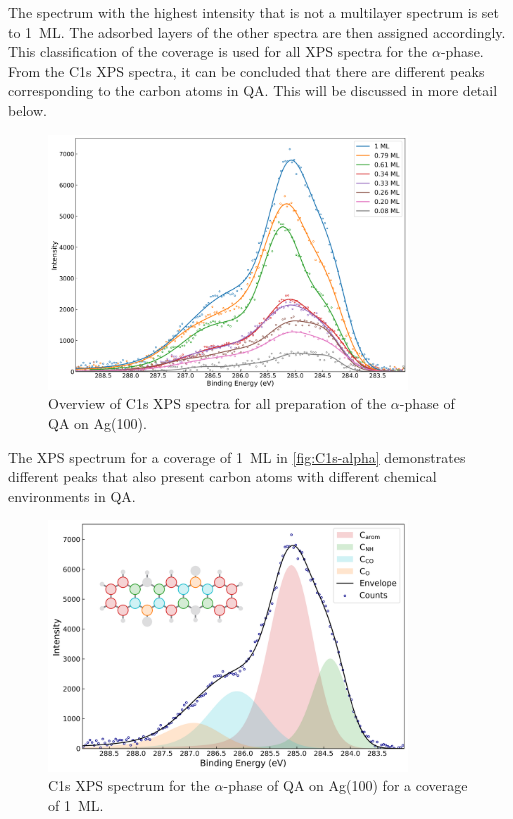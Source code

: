 The spectrum with the highest intensity that is not a multilayer spectrum is set to 1~\ac{ML}. The adsorbed layers of the other spectra are then assigned accordingly. This classification of the coverage is used for all \ac{XPS} spectra for the $\alpha$-phase.
From the C1s \ac{XPS} spectra, it can be concluded that there are different peaks corresponding to the carbon atoms in \ac{QA}. This will be discussed in more detail below.

\begin{figure}[H]
	\centering
	\includegraphics[width=0.85\textwidth]{images/C1s-alpha-comparison.png}
	\caption{Overview of C1s \ac{XPS} spectra for all preparation of the $\alpha$-phase of \ac{QA} on Ag(100).}
	\label{fig:C1s-comparison}
\end{figure}

The \ac{XPS} spectrum for a coverage of 1~\ac{ML} in \autoref{fig:C1s-alpha} demonstrates different peaks that also present carbon atoms with different chemical environments in \ac{QA}.

\begin{figure}[H]
	\centering
	\includegraphics[width=0.85\textwidth]{images/C1s-alpha-P1.png}
	\caption{C1s \ac{XPS} spectrum for the $\alpha$-phase of \ac{QA} on Ag(100) for a coverage of 1~\ac{ML}.}
	\label{fig:C1s-alpha}
\end{figure}

